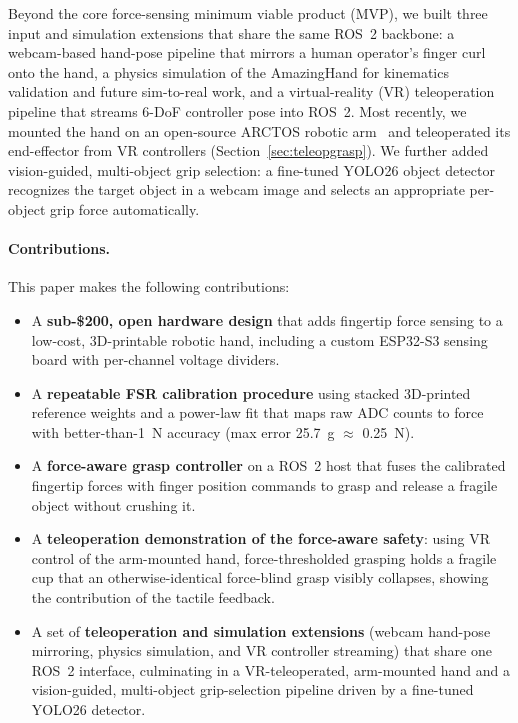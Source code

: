 \documentclass[acmlarge,screen,nonacm]{acmart}
\begin{document}
Beyond the core force-sensing minimum viable product (MVP), we built three
input and simulation extensions that share the same ROS~2 backbone: a
webcam-based hand-pose pipeline that mirrors a human operator's finger curl onto
the hand, a physics simulation of the AmazingHand for kinematics validation and
future sim-to-real work, and a virtual-reality (VR) teleoperation pipeline that
streams 6-DoF controller pose into ROS~2. Most recently, we mounted the hand on
an open-source ARCTOS robotic arm~\cite{arctos2024} and teleoperated its
end-effector from VR controllers (Section~\ref{sec:teleopgrasp}). We
further added vision-guided, multi-object grip selection: a fine-tuned YOLO26
object detector recognizes the target object in a webcam image and selects an
appropriate per-object grip force automatically.

\paragraph{Contributions.} This paper makes the following contributions:
\begin{itemize}
  \item A \textbf{sub-\$200, open hardware design} that adds fingertip force
        sensing to a low-cost, 3D-printable robotic hand, including a custom
        ESP32-S3 sensing board with per-channel voltage dividers.
  \item A \textbf{repeatable FSR calibration procedure} using stacked 3D-printed
        reference weights and a power-law fit that maps raw ADC counts to force
        with better-than-1~N accuracy (max error 25.7~g $\approx$ 0.25~N).
  \item A \textbf{force-aware grasp controller} on a ROS~2 host that fuses the
        calibrated fingertip forces with finger position commands to grasp and
        release a fragile object without crushing it.
  \item A \textbf{teleoperation demonstration of the force-aware safety}: using VR control of the arm-mounted hand, force-thresholded
        grasping holds a fragile cup that an otherwise-identical force-blind
        grasp visibly collapses, showing the contribution of the tactile
        feedback.
  \item A set of \textbf{teleoperation and simulation extensions}
        (webcam hand-pose mirroring, physics simulation, and VR controller
        streaming) that share one ROS~2 interface, culminating in a
        VR-teleoperated, arm-mounted hand and a vision-guided, multi-object
        grip-selection pipeline driven by a fine-tuned YOLO26 detector.
\end{itemize}
\end{document}
